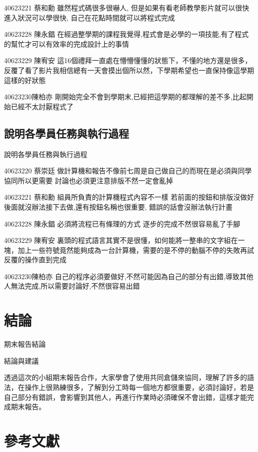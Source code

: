 \documentclass[12pt,,]{report}
\begin{document}
40623221 蔡和勳 雖然程式碼很多很嚇人,
但是如果有看老師教學影片就可以很快進入狀況可以學很快,
自己在花點時間就可以將程式完成

40623228 陳永錩
在經過整學期的課程我覺得,程式會是必學的一項技能,有了程式的幫忙才可以有效率的完成設計上的事情

40623229 陳宥安
這16個禮拜一直處在懵懵懂懂的狀態下，不懂的地方還是很多，反覆了看了影片我相信總有一天會摸出個所以然，下學期希望也一直保持像這學期這樣的好狀態

40623230陳柏亦
剛開始完全不會到學期末,已經把這學期的都理解的差不多,比起開始已經不太討厭程式了

\hypertarget{ux8aaaux660eux5404ux5b78ux54e1ux4efbux52d9ux8207ux57f7ux884cux904eux7a0b}{%
\section{說明各學員任務與執行過程}\label{ux8aaaux660eux5404ux5b78ux54e1ux4efbux52d9ux8207ux57f7ux884cux904eux7a0b}}

說明各學員任務與執行過程

40623220 蔡崇廷
做計算機和報告不像前七周是自己做自己的而現在是必須與同學協同所以更需要
討論也必須更注意排版不然一定會亂掉

40623221 蔡和勳 組員所負責的計算機程式內容不一樣
若前面的按鈕和排版沒做好後面就沒辦法接下去做,還有按鈕名稱也很重要,
錯誤的話會沒辦法執行計畫

40623228 陳永錩 必須將流程已有條理的方式 逐步的完成不然很容易亂了手腳

40623229 陳宥安
裏頭的程式語言其實不是很懂，如何能將一整串的文字組在一塊，加上一些符號竟然能夠成為一台計算機，需要的是不停的動腦不停的失敗再試反覆的操作直到完成

40623230陳柏亦
自己的程序必須要做好,不然可能因為自己的部分有出錯,導致其他人無法完成,所以需要討論好,不然很容易出錯

\hypertarget{ux7d50ux8ad6}{%
\chapter{結論}\label{ux7d50ux8ad6}}

期末報告結論

結論與建議

透過這次的小組期末報告合作，大家學會了使用共同倉儲來協同，理解了許多的語法，在操作上很熟練很多，了解到分工時每一個地方都很重要，必須討論好，若是自己部分有錯誤，會影響到其他人，再進行作業時必須確保不會出錯，這樣才能完成期末報告。

\hypertarget{ux53c3ux8003ux6587ux737b}{%
\chapter{參考文獻}\label{ux53c3ux8003ux6587ux737b}}
\end{document}
